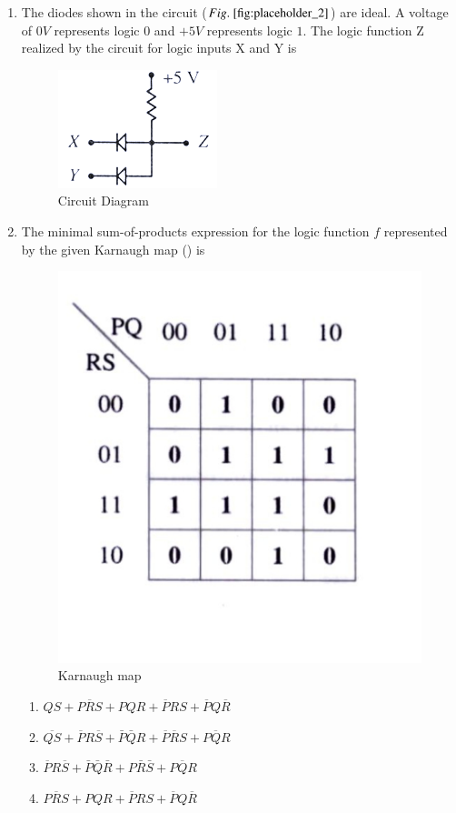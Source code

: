 \documentclass[journal,12pt,onecolumn]{IEEEtran}
\theoremstyle{remark}
\begin{document}
\begin{enumerate}
 
\item The diodes shown in the circuit ($\figref{fig:placeholder_2}$) are ideal. A voltage of $0V$ represents logic $0$ and $+5V$  represents logic $1$. The logic function Z realized by the circuit for logic inputs X and Y is\par  \hfill{}
\begin{figure}[H]
    \centering
    \includegraphics[width=0.3\columnwidth]{Figs/Q-7.png}
    \caption{Circuit Diagram}
    \label{fig:placeholder_2}
\end{figure}
\begin{enumerate}
\end{enumerate}

 
\item The minimal sum-of-products expression for the logic function $f$ represented by the given Karnaugh map () is\par \hfill{} 
\begin{figure}[H]
    \centering
    \includegraphics[width=0.3\columnwidth]{Figs/Q-8.jpg}
    \caption{Karnaugh map}
    \label{fig:placeholder_3}
\end{figure}
    \begin{enumerate}
        \item $QS+P\overline{R}S+PQR+\overline{P}RS+\overline{P}Q\overline{R}$
        \item $\overline{QS}+\overline{P}R\overline{S}+\bar{P}\bar{Q}R+\overline{P}\overline{R}S+P\overline{Q}R$
        \item $\overline{P}R\overline{S}+\bar{P}\bar{Q}\bar{R}+P\bar{R}\bar{S}+P\overline{Q}R$
        \item $P\overline{R}S+PQR+\overline{P}RS+\overline{P}Q\overline{R}$
\end{enumerate}


\end{enumerate}
\end{document}
